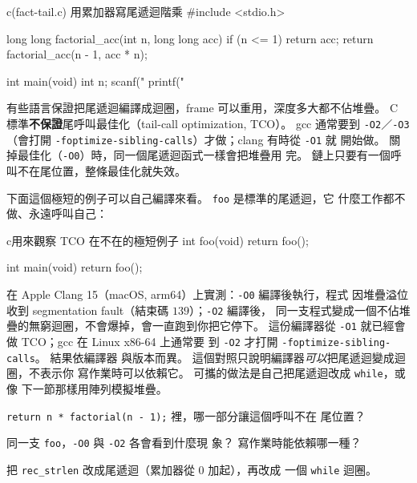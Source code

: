 \begin{example}{c}{(fact-tail.c) 用累加器寫尾遞迴階乘}
#include <stdio.h>

long long factorial_acc(int n, long long acc) {
    if (n <= 1) {
        return acc;
    }
    return factorial_acc(n - 1, acc * n);
}

int main(void) {
    int n;
    scanf("%
    printf("%
}
\end{example}


有些語言保證把尾遞迴編譯成迴圈，frame 可以重用，深度多大都不佔堆疊。
C 標準\textbf{不保證}尾呼叫最佳化（tail-call optimization, TCO）。
gcc 通常要到 \texttt{-O2}／\texttt{-O3}（會打開
\texttt{-foptimize-sibling-calls}）才做；clang 有時從 \texttt{-O1} 就
開始做。 關掉最佳化（\texttt{-O0}）時，同一個尾遞迴函式一樣會把堆疊用
完。 鏈上只要有一個呼叫不在尾位置，整條最佳化就失效。

下面這個極短的例子可以自己編譯來看。 \texttt{foo} 是標準的尾遞迴，它
什麼工作都不做、永遠呼叫自己：

\begin{code}{c}{用來觀察 TCO 在不在的極短例子}
int foo(void) {
    return foo();
}

int main(void) {
    return foo();
}
\end{code}

在 Apple Clang 15（macOS, arm64）上實測：\texttt{-O0} 編譯後執行，程式
因堆疊溢位收到 segmentation fault（結束碼 $139$）；\texttt{-O2} 編譯後，
同一支程式變成一個不佔堆疊的無窮迴圈，不會爆掉，會一直跑到你把它停下。
這份編譯器從 \texttt{-O1} 就已經會做 TCO；gcc 在 Linux x86-64 上通常要
到 \texttt{-O2} 才打開 \texttt{-foptimize-sibling-calls}。 結果依編譯器
與版本而異。 這個對照只說明編譯器\emph{可以}把尾遞迴變成迴圈，不表示你
寫作業時可以依賴它。 可攜的做法是自己把尾遞迴改成 \texttt{while}，或像
下一節那樣用陣列模擬堆疊。


\begin{drills}[label=drills:rec-tail]
\item \texttt{return n * factorial(n - 1);} 裡，哪一部分讓這個呼叫不在
尾位置？
\item 同一支 \texttt{foo}，\texttt{-O0} 與 \texttt{-O2} 各會看到什麼現
象？ 寫作業時能依賴哪一種？
\item 把 \texttt{rec\_strlen} 改成尾遞迴（累加器從 $0$ 加起），再改成
一個 \texttt{while} 迴圈。
\end{drills}

